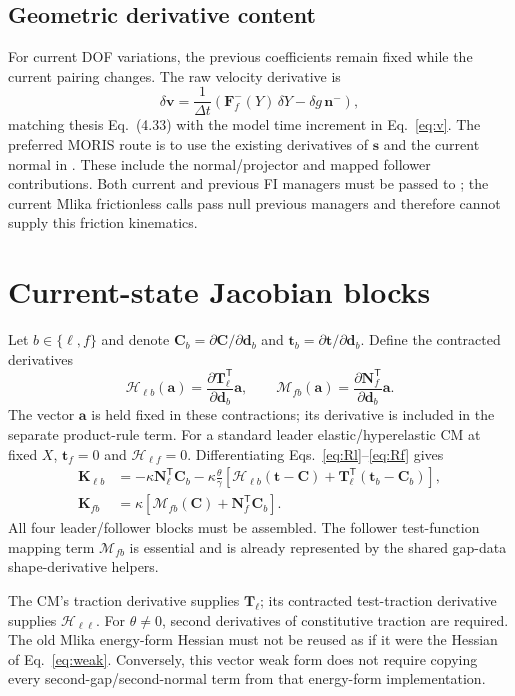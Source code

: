 \documentclass[11pt,a4paper]{article}
\newcommand{\tr}{^{\mathsf T}}
\newcommand{\vn}{\bm n}
\newcommand{\vt}{\bm t}
\newcommand{\vs}{\bm s}
\newcommand{\vC}{\bm C}
\newcommand{\Nm}{\bm N}
\newcommand{\Tm}{\bm T}
\newcommand{\code}[1]{\texttt{\detokenize{#1}}}
\begin{document}
\subsection{Geometric derivative content}
For current DOF variations, the previous coefficients remain fixed while the
current pairing changes. The raw velocity derivative is
\begin{equation}\label{eq:dv}
 \delta\bm v=\frac{1}{\Delta t}
 \left(\bm F^-_f(Y)\,\delta Y-\delta g\,\vn^-\right),
\end{equation}
matching thesis Eq.~(4.33) with the model time increment in Eq.~\eqref{eq:v}. The preferred MORIS
route is to use the existing derivatives of $\vs$ and the current normal in
\code{GapData}. These include the normal/projector and mapped follower
contributions. Both current and previous FI managers must be passed to
\code{Contact_Geometry}; the current Mlika frictionless calls pass null previous
managers and therefore cannot supply this friction kinematics.

\section{Current-state Jacobian blocks}
Let $b\in\{\ell,f\}$ and denote
$\vC_b=\partial\vC/\partial\bm d_b$ and
$\vt_b=\partial\vt/\partial\bm d_b$. Define the contracted derivatives
\begin{equation}
 \mathcal H_{\ell b}(\bm a)
 =\frac{\partial\Tm_\ell\tr}{\partial\bm d_b}\bm a,
 \qquad
 \mathcal M_{fb}(\bm a)
 =\frac{\partial\Nm_f\tr}{\partial\bm d_b}\bm a.
\end{equation}
The vector $\bm a$ is held fixed in these contractions; its derivative is
included in the separate product-rule term. For a standard leader
elastic/hyperelastic CM at fixed $X$, $\vt_f=0$ and
$\mathcal H_{\ell f}=0$. Differentiating Eqs.~\eqref{eq:Rl}--\eqref{eq:Rf} gives
\begin{align}
 \bm K_{\ell b}
 &=-\kappa\Nm_\ell\tr\vC_b
 -\kappa\frac{\theta}{\gamma}
 \left[\mathcal H_{\ell b}(\vt-\vC)
       +\Tm_\ell\tr(\vt_b-\vC_b)\right],\label{eq:Kl}\\
 \bm K_{fb}
 &=\kappa\left[\mathcal M_{fb}(\vC)+\Nm_f\tr\vC_b\right].\label{eq:Kf}
\end{align}
All four leader/follower blocks must be assembled. The follower test-function
mapping term $\mathcal M_{fb}$ is essential and is already represented by the
shared gap-data shape-derivative helpers.

The CM's traction derivative supplies $\Tm_\ell$; its contracted test-traction
derivative supplies $\mathcal H_{\ell\ell}$. For $\theta\ne0$, second derivatives
of constitutive traction are required. The old Mlika energy-form Hessian must
not be reused as if it were the Hessian of Eq.~\eqref{eq:weak}. Conversely, this
vector weak form does not require copying every second-gap/second-normal term
from that energy-form implementation.
\end{document}
